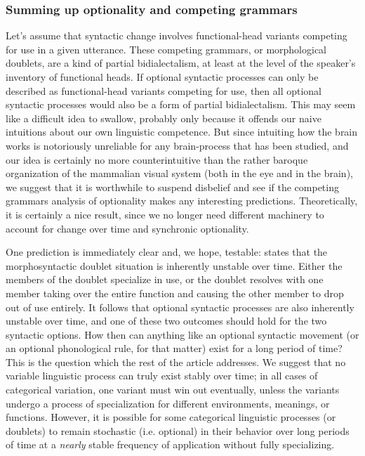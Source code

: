 \subsubsection{Summing up optionality and competing grammars}
Let's assume that syntactic change involves functional-head variants competing for use in a given utterance.
These competing grammars, or morphological doublets, are a kind of partial bidialectalism, at least at the level of the speaker's inventory of functional heads.
If optional syntactic processes can only be described as functional-head variants competing for use, then all optional syntactic processes would also be a form of partial bidialectalism.
This may seem like a difficult idea to swallow, probably only because it offends our naive intuitions about our own linguistic competence.
But since intuiting how the brain works is notoriously unreliable for any brain-process that has been studied, and our idea is certainly no more counterintuitive than the rather baroque organization of the mammalian visual system (both in the eye and in the brain), we suggest that it is worthwhile to suspend disbelief and see if the competing grammars analysis of optionality makes any interesting predictions.
Theoretically, it is certainly a nice result, since we no longer need different machinery to account for change over time and synchronic optionality.


One prediction is immediately clear and, we hope, testable: \citet{kroch1989,kroch1994} states that the morphosyntactic doublet situation is inherently unstable over time.
Either the members of the doublet specialize in use, or the doublet resolves with one member taking over the entire function and causing the other member to drop out of use entirely.
It follows that optional syntactic processes are also inherently unstable over time, and one of these two outcomes should hold for the two syntactic options.
How then can anything like an optional syntactic movement (or an optional phonological rule, for that matter) exist for a long period of time? This is the question which the rest of the article addresses.
We suggest that no variable linguistic process can truly exist stably over time; in all cases of categorical variation, one variant must win out eventually, unless the variants undergo a process of specialization for different environments, meanings, or functions.
However, it is possible for some categorical linguistic processes (or doublets) to remain stochastic (i.e. optional) in their behavior over long periods of time at a \textsl{nearly} stable frequency of application without fully specializing. 


